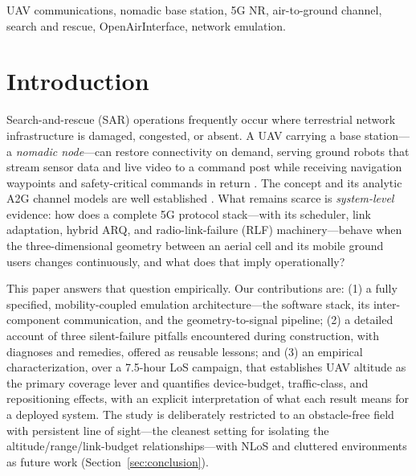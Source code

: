 \documentclass[10pt, conference]{IEEEtran}
\begin{document}
\begin{IEEEkeywords}
UAV communications, nomadic base station, 5G NR, air-to-ground channel, search and rescue, OpenAirInterface, network emulation.
\end{IEEEkeywords}

\section{Introduction}
Search-and-rescue (SAR) operations frequently occur where terrestrial network infrastructure is damaged, congested, or absent. A UAV carrying a base station---a \emph{nomadic node}---can restore connectivity on demand, serving ground robots that stream sensor data and live video to a command post while receiving navigation waypoints and safety-critical commands in return \cite{zeng2016wireless, zeng2019accessing, mozaffari2019tutorial}. The concept and its analytic A2G channel models are well established \cite{alhourani2014optimal, 3gpp36777}. What remains scarce is \emph{system-level} evidence: how does a complete 5G protocol stack---with its scheduler, link adaptation, hybrid ARQ, and radio-link-failure (RLF) machinery---behave when the three-dimensional geometry between an aerial cell and its mobile ground users changes continuously, and what does that imply operationally?

This paper answers that question empirically. Our contributions are: (1) a fully specified, mobility-coupled emulation architecture---the software stack, its inter-component communication, and the geometry-to-signal pipeline; (2) a detailed account of three silent-failure pitfalls encountered during construction, with diagnoses and remedies, offered as reusable lessons; and (3) an empirical characterization, over a 7.5-hour LoS campaign, that establishes UAV altitude as the primary coverage lever and quantifies device-budget, traffic-class, and repositioning effects, with an explicit interpretation of what each result means for a deployed system. The study is deliberately restricted to an obstacle-free field with persistent line of sight---the cleanest setting for isolating the altitude/range/link-budget relationships---with NLoS and cluttered environments as future work (Section~\ref{sec:conclusion}).
\end{document}
